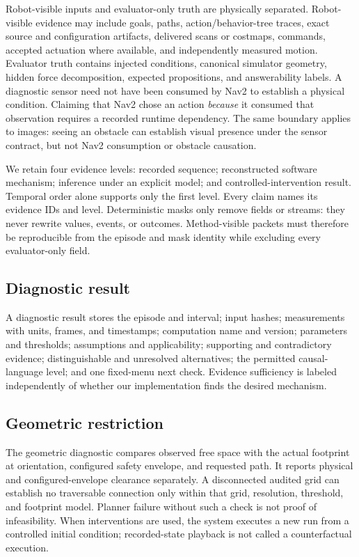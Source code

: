 \documentclass[conference]{IEEEtran}
\begin{document}
Robot-visible inputs and evaluator-only truth are physically separated. Robot-visible evidence may
include goals, paths, action/behavior-tree traces, exact source and configuration artifacts,
delivered scans or costmaps, commands, accepted actuation where available, and independently
measured motion. Evaluator truth contains injected conditions, canonical simulator geometry,
hidden force decomposition, expected propositions, and answerability labels. A diagnostic sensor
need not have been consumed by Nav2 to establish a physical condition. Claiming that Nav2 chose an
action \emph{because} it consumed that observation requires a recorded runtime dependency. The
same boundary applies to images: seeing an obstacle can establish visual presence under the sensor
contract, but not Nav2 consumption or obstacle causation.

We retain four evidence levels: recorded sequence; reconstructed software mechanism; inference
under an explicit model; and controlled-intervention result. Temporal order alone supports only
the first level. Every claim names its evidence IDs and level. Deterministic masks only remove
fields or streams: they never rewrite values, events, or outcomes. Method-visible packets must
therefore be reproducible from the episode and mask identity while excluding every evaluator-only
field.

\subsection{Diagnostic result}

A diagnostic result stores the episode and interval; input hashes; measurements with units,
frames, and timestamps; computation name and version; parameters and thresholds; assumptions and
applicability; supporting and contradictory evidence; distinguishable and unresolved alternatives;
the permitted causal-language level; and one fixed-menu next check. Evidence sufficiency is labeled
independently of whether our implementation finds the desired mechanism.

\subsection{Geometric restriction}

The geometric diagnostic compares observed free space with the actual footprint at orientation,
configured safety envelope, and requested path. It reports physical and configured-envelope
clearance separately. A disconnected audited grid can establish no traversable connection only
within that grid, resolution, threshold, and footprint model. Planner failure without such a check
is not proof of infeasibility. When interventions are used, the system executes a new run from a
controlled initial condition; recorded-state playback is not called a counterfactual execution.
\end{document}
